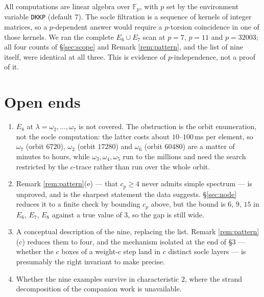 \documentclass[reqno]{amsart}
\theoremstyle{plain}
\theoremstyle{definition}
\newcommand{\la}{\lambda}
\newcommand{\om}{\omega}
\begin{document}
All computations are linear algebra over $\mathbb{F}_p$, with $p$ set by the
environment variable \verb|DKKP| (default $7$).  The socle filtration is a
sequence of kernels of integer matrices, so a $p$-dependent answer would
require a $p$-torsion coincidence in one of those kernels.  We ran the
complete $E_6\cup E_7$ scan at $p=7$, $p=11$ and $p=32003$; all four counts of
\S\ref{sec:scope} and Remark \ref{rem:pattern}, and the list of nine itself,
were identical at all three.  This is evidence of $p$-independence, not a
proof of it.

\section{Open ends}

\begin{enumerate}[label=(\arabic*)]
\item $E_8$ at $\la=\om_2,\dots,\om_7$ is not covered.  The obstruction is the
orbit enumeration, not the socle computation: the latter costs about
$10$--$100$\,ms per element, so $\om_7$ (orbit $6720$), $\om_2$ (orbit
$17280$) and $\om_6$ (orbit $60480$) are a matter of minutes to hours, while
$\om_3,\om_4,\om_5$ run to the millions and need the search restricted by the
$c$-trace rather than run over the whole orbit.
\item Remark \ref{rem:pattern}(e) --- that $c_p\ge4$ never admits simple
spectrum --- is unproved, and is the sharpest statement the data suggests.
\S\ref{sec:node} reduces it to a finite check by bounding $c_p$ above, but the
bound is $6$, $9$, $15$ in $E_6$, $E_7$, $E_8$ against a true value of $3$, so
the gap is still wide.
\item A conceptual description of the nine, replacing the list.  Remark
\ref{rem:pattern}(c) reduces them to four, and the mechanism isolated at the
end of \S3 --- whether the $c$ boxes of a weight-$c$ step land in $c$ distinct
socle layers --- is presumably the right invariant to make precise.
\item Whether the nine examples survive in characteristic $2$, where the
strand decomposition of the companion work is unavailable.
\end{enumerate}
\end{document}
